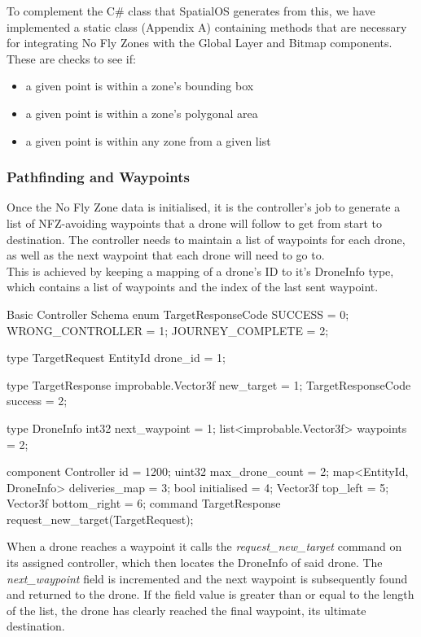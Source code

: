 \documentclass[a4paper,12pt,titlepage]{article}
\begin{document}
To complement the C\# class that SpatialOS generates from this, we have implemented a static class (Appendix A) containing methods that are necessary for integrating No Fly Zones with the Global Layer and Bitmap components. These are checks to see if:
\begin{itemize}
  \item a given point is within a zone's bounding box
  \item a given point is within a zone's polygonal area
  \item a given point is within any zone from a given list
\end{itemize}

\subsubsection{Pathfinding and Waypoints}
Once the No Fly Zone data is initialised, it is the controller's job to generate a list of NFZ-avoiding waypoints that a drone will follow to get from start to destination. The controller needs to maintain a list of waypoints for each drone, as well as the next waypoint that each drone will need to go to.\\

This is achieved by keeping a mapping of a drone's ID to it's DroneInfo type, which contains a list of waypoints and the index of the last sent waypoint.

\begin{sexylisting}[colback=white]{Basic Controller Schema}
enum TargetResponseCode {
  SUCCESS = 0;
  WRONG_CONTROLLER = 1;
  JOURNEY_COMPLETE = 2;
}

type TargetRequest {
  EntityId drone_id = 1;
}

type TargetResponse {
  improbable.Vector3f new_target = 1;
  TargetResponseCode success = 2;
}

type DroneInfo {
  int32 next_waypoint = 1;
  list<improbable.Vector3f> waypoints = 2;
}

component Controller {
  id = 1200;
  uint32 max_drone_count = 2;
  map<EntityId, DroneInfo> deliveries_map = 3;
  bool initialised = 4;
  Vector3f top_left = 5;
  Vector3f bottom_right = 6;
  command TargetResponse request_new_target(TargetRequest);
}
\end{sexylisting}

\newpage
When a drone reaches a waypoint it calls the \textit{request\_new\_target} command on its assigned controller, which then locates the DroneInfo of said drone. The \textit{next\_waypoint} field is incremented and the next waypoint is subsequently found and returned to the drone. If the field value is greater than or equal to the length of the list, the drone has clearly reached the final waypoint, its ultimate destination.
\end{document}
